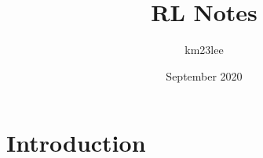 \documentclass{article}
\title{RL Notes}
\author{km23lee }
\date{September 2020}
\begin{document}
\maketitle

\section{Introduction}
\end{document}
